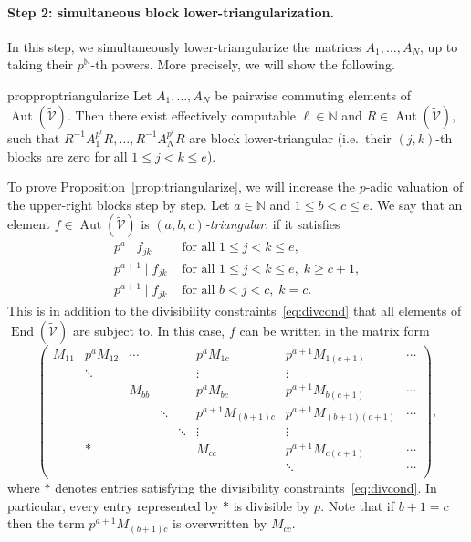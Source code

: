 \documentclass[letterpaper, 11pt, thm-restate]{article}
\numberwithin{equation}{section}
\newcommand{\N}{\mathbb{N}}
\newcommand{\Aut}{\operatorname{Aut}}
\newcommand{\End}{\operatorname{End}}
\newcommand{\tmV}{\widetilde{\mathcal{V}}}
\newcommand{\red}{\textcolor{red}}
\theoremstyle{definition}
\theoremstyle{definition}
\theoremstyle{definition}
\begin{document}
\paragraph{Step 2: simultaneous block lower-triangularization.}

In this step, we simultaneously lower-triangularize the matrices $A_1, \ldots, A_N$, up to taking their $p^{\N}$-th powers.
More precisely, we will show the following.

\begin{restatable}{prop}{proptriangularize}\label{prop:triangularize}
    Let $A_1, \ldots, A_N$ be pairwise commuting elements of $\Aut(\tmV)$.
    Then there exist effectively computable $\ell \in \N$ and $R \in \Aut(\tmV)$, such that $R^{-1}A_1^{p^{\ell}}R, \ldots, R^{-1}A_N^{p^{\ell}}R$ are block lower-triangular (i.e.\ their $(j,k)$-th blocks are zero for all $1 \leq j < k \leq e$).
\end{restatable}

To prove Proposition~\ref{prop:triangularize}, we will increase the $p$-adic valuation of the upper-right blocks step by step.
Let $a \in \N$ and $1 \leq b < c \leq e$. 
We say that an element $f \in \Aut(\tmV)$ is \emph{$(a,b,c)$-triangular}, if it satisfies
\begin{align}\label{eq:abctriangular}
    p^{a} \mid f_{jk} & \text{ for all } 1 \leq j < k \leq e, \nonumber\\
    p^{a+1} \mid f_{jk} & \text{ for all } 1 \leq j < k \leq e, \; k \geq c +1, \nonumber\\
    p^{a+1} \mid f_{jk} & \text{ for all } b<j< c, \; k = c.
\end{align}
This is in addition to the divisibility constraints~\eqref{eq:divcond} that all elements of $\End(\tmV)$ are subject to.
In this case, $f$ can be written in the matrix form
\[
    \begin{pmatrix}
        M_{11} & p^a M_{12} & \cdots & & & p^a M_{1c} & p^{a+1} M_{1(c+1)} & \cdots \\    
         &  \ddots & & & & \vdots & \vdots \\
         &  & M_{bb} & & & p^a M_{bc} & p^{a+1} M_{b(c+1)} & \cdots \\
         & & & \ddots & & p^{a+1} M_{(b+1)c} & p^{a+1} M_{(b+1)(c+1)} & \cdots \\
        & & & & \ddots & \vdots & \vdots \\
        &*&&&& M_{cc} & p^{a+1} M_{c(c+1)} & \cdots \\
        &&&&& & \ddots & \cdots \\
    \end{pmatrix},
\]
where $*$ denotes entries satisfying the divisibility constraints~\eqref{eq:divcond}.
In particular, every entry represented by $*$ is divisible by $p$.
Note that if $b+1 = c$ then the term $p^{a+1} M_{(b+1)c}$ is overwritten by $M_{cc}$.
\end{document}
